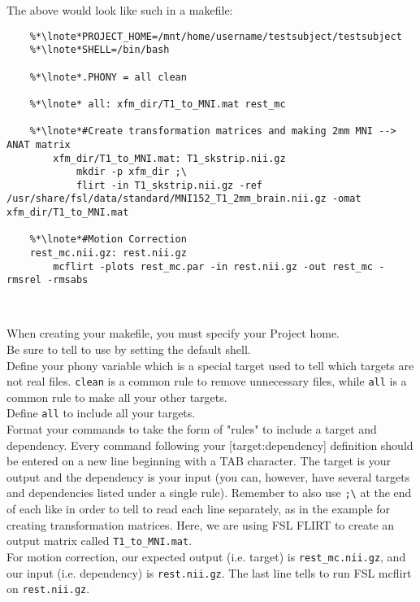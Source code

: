The above would look like such in a makefile: %
\begin{lstlisting}
	%*\lnote*PROJECT_HOME=/mnt/home/username/testsubject/testsubject
	%*\lnote*SHELL=/bin/bash
	
	%*\lnote*.PHONY = all clean	
	
	%*\lnote* all: xfm_dir/T1_to_MNI.mat rest_mc

	%*\lnote*#Create transformation matrices and making 2mm MNI --> ANAT matrix
		xfm_dir/T1_to_MNI.mat: T1_skstrip.nii.gz 
			mkdir -p xfm_dir ;\
			flirt -in T1_skstrip.nii.gz -ref /usr/share/fsl/data/standard/MNI152_T1_2mm_brain.nii.gz -omat xfm_dir/T1_to_MNI.mat

	%*\lnote*#Motion Correction
	rest_mc.nii.gz: rest.nii.gz
		mcflirt -plots rest_mc.par -in rest.nii.gz -out rest_mc -rmsrel -rmsabs

	
\end{lstlisting}

When creating your makefile, you must specify your Project home. \\
\indent\lnum{4}Be sure to tell \maken{} to use \bashn{} by setting the default shell. \\
\indent\lnum{5}Define your phony variable which is a special target used to tell \maken{} which targets are not real files. \texttt{clean} is a common rule to remove unnecessary files, while \texttt{all} is a common rule to make all your other targets. \\
\indent\lnum{6}Define \texttt{all} to include all your targets. \\
\indent\lnum{7}Format your commands to take the form of "rules" to include a target and dependency. Every command following your [target:dependency] definition should be entered on a new line beginning with a TAB character. The target is your output and the dependency is your input (you can, however, have several targets and dependencies listed under a single rule). Remember to also use \texttt{;\textbackslash{}} at the end of each like in order to tell \maken{} to read each line separately, as in the example for creating transformation matrices. Here, we are using FSL FLIRT to create an output matrix called \texttt{T1_to_MNI.mat}. \\ 
\indent\lnum{8}For motion correction, our expected output (i.e. target) is \texttt{rest_mc.nii.gz}, and our input (i.e. dependency) is \texttt{rest.nii.gz}. The last line tells \maken{} to run FSL mcflirt on \texttt{rest.nii.gz}. 

